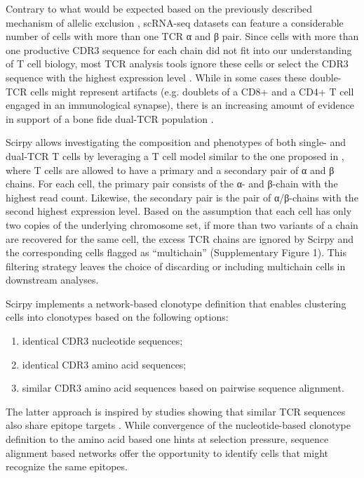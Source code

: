 \documentclass{article}
\begin{document}
Contrary to what would be expected based on the previously described mechanism of allelic exclusion \cite{Brady2010-gh}, scRNA-seq datasets can feature a considerable number of cells with more than one TCR α and β pair. Since cells with more than one productive CDR3 sequence for each chain did not fit into our understanding of T cell biology, most TCR analysis tools ignore these cells \cite{Fischer_undated-cx, Zhang2018-ip} or select the CDR3 sequence with the highest expression level \cite{Afik2017-sg}. While in some cases these double-TCR cells might represent artifacts (e.g. doublets of a CD8+ and a CD4+ T cell engaged in an immunological synapse), there is an increasing amount of evidence in support of a bone fide dual-TCR population \cite{Schuldt2019-ey, Ji2010-bn}. \par

Scirpy allows investigating the composition and phenotypes of both single- and dual-TCR T cells by leveraging a T cell model similar to the one proposed in \cite{Stubbington2016-kh}, where T cells are allowed to have a primary and a secondary pair of α and β chains. For each cell, the primary pair consists of the α- and β-chain with the highest read count. Likewise, the secondary pair is the pair of α/β-chains with the second highest expression level. Based on the assumption that each cell has only two copies of the underlying chromosome set, if more than two variants of a chain are recovered for the same cell, the excess TCR chains are ignored by Scirpy and the corresponding cells flagged as “multichain” (Supplementary Figure 1). This filtering strategy leaves the choice of discarding or including multichain cells in downstream analyses.\par

Scirpy implements a network-based clonotype definition that enables clustering cells into clonotypes based on the following options:
\begin{enumerate}[label=(\alph*)]
    \item identical CDR3 nucleotide sequences;
    \item identical CDR3 amino acid sequences;
    \item similar CDR3 amino acid sequences based on pairwise sequence alignment. 
\end{enumerate}

The latter approach is inspired by studies showing that similar TCR sequences also share epitope targets \cite{Glanville2017-ay, Dash2017-xt, Fischer_undated-cx}. While convergence of the nucleotide-based clonotype definition to the amino acid based one hints at selection pressure, sequence alignment based networks offer the opportunity to identify cells that might recognize the same epitopes.\par

\newpage

\printbibliography[title={Supplementary References}]
\end{document}
